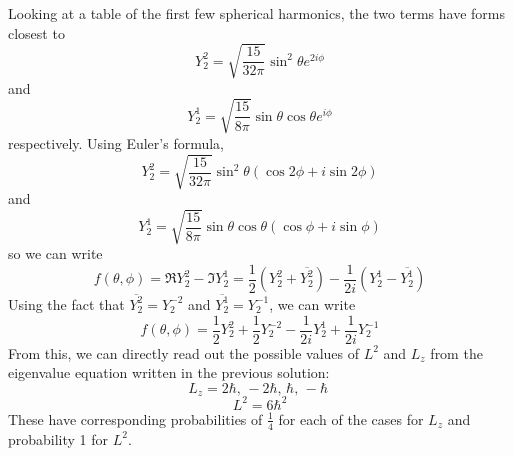 \documentclass{article}
\begin{document}
Looking at a table of the first few spherical harmonics, the two terms have forms closest to
\[
  Y_{2}^{ 2} = \sqrt{\frac{15}{32\pi}}\sin^{2}\theta e^{2i\phi}
\]
and
\[
  Y_{2}^{ 1} = \sqrt{\frac{15}{8\pi}}\sin\theta\cos\theta e^{i\phi}
\]
respectively.
Using Euler's formula,
\[
  Y_{2}^{ 2} = \sqrt{\frac{15}{32\pi}}\sin^{2}\theta(\cos 2\phi + i\sin 2\phi)
\]
and
\[
  Y_{2}^{ 1} = \sqrt{\frac{15}{8\pi}}\sin\theta\cos\theta(\cos\phi + i\sin\phi)
\]
so we can write
\[
  f(\theta,\phi) = \Re{Y_{2}^{2}} - \Im{Y_{2}^{1}} = \frac{1}{2}\left(Y_{2}^{2} + \overline{Y_{2}^{2}}\right)
  - \frac{1}{2i}\left( Y_{2}^{1}-\overline{Y_{2}^{1}} \right)
\]
Using the fact that $\overline{Y_{2}^{2}} = Y_{2}^{-2}$ and $\overline{Y_{2}^{1}} = Y_{2}^{-1}$, we can write
\[
  f(\theta,\phi) = \frac{1}{2}Y_{2}^{2}+\frac{1}{2}Y_{2}^{-2}-\frac{1}{2i}Y_{2}^{1}+\frac{1}{2i}Y_{2}^{-1}
\]
From this, we can directly read out the possible values of $L^{2}$ and $L_{z}$ from the eigenvalue equation written in the previous solution:
\[
  L_{z} = 2\hbar,\, -2\hbar,\, \hbar,\, -\hbar \;
\]
\[
  L^{2} = 6\hbar^{2}
\]
These have corresponding probabilities of $\frac{1}{4}$ for each of the cases for $L_{z}$ and probability 1 for $L^{2}$.
\end{document}
